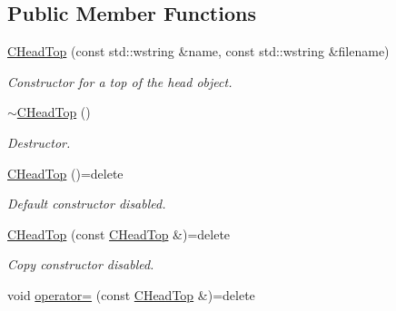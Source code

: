 \subsection*{Public Member Functions}
\begin{DoxyCompactItemize}
\item 
\hyperlink{class_c_head_top_a31333179dc1836d6ae5b9636b215b66b}{C\+Head\+Top} (const std\+::wstring \&name, const std\+::wstring \&filename)
\begin{DoxyCompactList}\small\item\em Constructor for a top of the head object. \end{DoxyCompactList}\item 
\hypertarget{class_c_head_top_a64697c81bc0100f66aa661a8bc430fa9}{\hyperlink{class_c_head_top_a64697c81bc0100f66aa661a8bc430fa9}{$\sim$\+C\+Head\+Top} ()}\label{class_c_head_top_a64697c81bc0100f66aa661a8bc430fa9}

\begin{DoxyCompactList}\small\item\em Destructor. \end{DoxyCompactList}\item 
\hypertarget{class_c_head_top_a54fab18f42f367ff9cfdf73537ada62f}{\hyperlink{class_c_head_top_a54fab18f42f367ff9cfdf73537ada62f}{C\+Head\+Top} ()=delete}\label{class_c_head_top_a54fab18f42f367ff9cfdf73537ada62f}

\begin{DoxyCompactList}\small\item\em Default constructor disabled. \end{DoxyCompactList}\item 
\hypertarget{class_c_head_top_a574b5950dff9f90de01219437f475cb9}{\hyperlink{class_c_head_top_a574b5950dff9f90de01219437f475cb9}{C\+Head\+Top} (const \hyperlink{class_c_head_top}{C\+Head\+Top} \&)=delete}\label{class_c_head_top_a574b5950dff9f90de01219437f475cb9}

\begin{DoxyCompactList}\small\item\em Copy constructor disabled. \end{DoxyCompactList}\item 
\hypertarget{class_c_head_top_aeb3522f283f90cb48b7b6a7ed6243aeb}{void \hyperlink{class_c_head_top_aeb3522f283f90cb48b7b6a7ed6243aeb}{operator=} (const \hyperlink{class_c_head_top}{C\+Head\+Top} \&)=delete}\label{class_c_head_top_aeb3522f283f90cb48b7b6a7ed6243aeb}


\end{DoxyCompactItemize}
